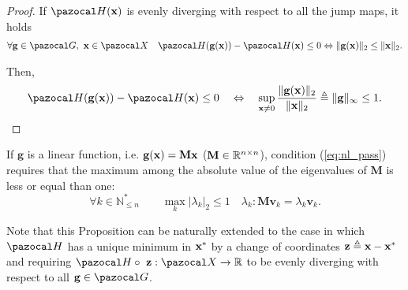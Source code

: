 %
\begin{proof}
	If $\Ha(\xb)$ is evenly diverging with respect to all the jump maps, it holds
	\begin{align}
	    \forall\mathbf{g}\in\G,~\xb\in\X\quad\Ha(\mathbf{g}(\xb))-\Ha(\xb)\leq 0 \Leftrightarrow \|\mathbf{g}(\xb)\|_2 \leq \|\xb\|_2.
	\end{align}
	
	Then,
	\begin{align*}
	\Ha(\mathbf{g}(\xb))-\Ha(\xb)\leq 0 \quad \Leftrightarrow \quad \sup\limits_{\xb\neq 0}\frac{\|\mathbf{g}(\xb)\|_2}{\|\xb\|_2} \triangleq \|\mathbf{g}\|_\infty\leq 1.
	\end{align*}
\end{proof}
%
If $\mathbf{g}$ is a linear function, i.e. $\mathbf{g}(\mathbf{x}) = \mathbf{M}\mathbf{x}$ ($\mathbf{M}\in\mathbb{R}^{n\times n}$), condition (\ref{eq:nl_pass}) requires that the maximum among the absolute value of the eigenvalues of $\mathbf{M}$ is less or equal than one:
%
\begin{equation}
	\forall k \in\mathbb{N}^*_{\leq n} \qquad \max\limits_{k}|\lambda_k|_2\leq 1\quad\lambda_k:\mathbf{M}\mathbf{v}_k = \lambda_k\mathbf{v}_k.
\end{equation}
%

Note that this Proposition can be naturally extended to the case in which $\Ha$ has a unique minimum in $\mathbf{x}^*$ by a change of coordinates $\mathbf{z}\triangleq \mathbf{x}-\mathbf{x}^*$ and requiring $\Ha \circ~\zb:\X\rightarrow\R$ to be evenly diverging with respect to all $\gb\in\G$.
%
\newline


